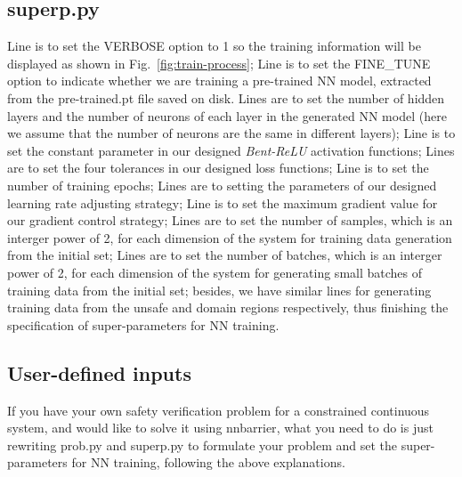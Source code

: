 \documentclass{llncs}
\begin{document}
\subsection{\textsf{superp.py}}
Line
is to set the \textsf{\small VERBOSE} option to 1 so the training information will be displayed as shown in Fig.~\ref{fig:train-process};
Line
is to set the \textsf{\small FINE\_TUNE} option to indicate whether we are training a pre-trained NN model,
extracted from the \textsf{pre-trained.pt} file saved on disk.
Lines
are to set the number of hidden layers and the number of neurons of each layer in the generated NN model (here we assume that
the number of neurons are the same in different layers);
Line
is to set the constant parameter in our designed \emph{Bent-ReLU} activation functions;
Lines
are to set the four tolerances in our designed loss functions;
Line
is to set the number of training epochs;
Lines
are to setting the parameters of our designed learning rate adjusting strategy;
Line
is to set the maximum gradient value for our gradient control strategy;
Lines
are to set the number of samples, which is an interger power of 2, for each dimension of the system for training data generation
from the initial set;
Lines
are to set the number of batches, which is an interger power of 2, for each dimension of the system for generating small batches 
of training data from the initial set; 
besides, we have similar lines for generating training data from the unsafe and
domain regions respectively, thus finishing the specification of super-parameters for NN training.

\subsection{User-defined inputs}
If you have your own safety verification problem for a constrained continuous system, and would like to solve it using \textsf{nnbarrier}, what
you need to do is just rewriting \textsf{prob.py} and \textsf{superp.py} to formulate your problem and set the super-parameters for NN training, following
the above explanations.




\end{document}
